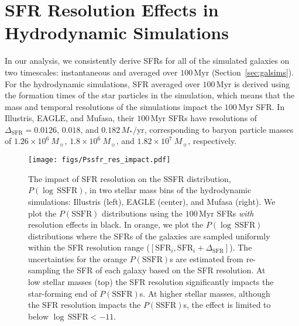 \documentclass[tighten, preprint]{aastex62}
\begin{document}
\section{SFR Resolution Effects in Hydrodynamic Simulations} \label{app:zerosfr}
In our analysis, we consistently derive SFRs for all of the simulated
galaxies on two timescales: instantaneous and averaged over 
$100\,\mathrm{Myr}$ (Section~\ref{sec:galsims}). For the hydrodynamic 
simulations, SFR averaged over $100\,\mathrm{Myr}$ is derived using 
the formation times of the star particles in the simulation, which 
means that the mass and temporal resolutions of the simulations 
impact the $100\,\mathrm{Myr}$ SFR. In Illustris, EAGLE, and {\sc Mufasa},
their $100\,\mathrm{Myr}$ SFRs have resolutions of 
$\Delta_\mathrm{SFR} = 0.0126$, $0.018$, and $0.182\,M_*/\mathrm{yr}$, 
corresponding to baryon particle masses of $1.26 \times 10^6\ M_{\sun}$, 
$1.8 \times 10^6\ M_{\sun}$, and $1.82 \times 10^7\ M_{\sun}$, respectively. 

\begin{figure*}
\begin{center}
\texttt{[image: figs/Pssfr\_res\_impact.pdf]} 
\caption{The impact of SFR resolution on the SSFR distribution, 
$P(\log\,\mathrm{SSFR})$, in two stellar mass bins of the hydrodynamic 
simulations:
Illustris (left), EAGLE (center), and {\sc Mufasa} (right). We plot the 
$P(\mathrm{SSFR})$ distributions using the $100\,\mathrm{Myr}$
SFRs \emph{with} resolution effects in black. In orange, we plot the 
$P(\log\,\mathrm{SSFR})$ distributions where the SFRs of the galaxies
are sampled uniformly within the SFR resolution range 
($[\mathrm{SFR}_i, \mathrm{SFR}_i+\Delta_\mathrm{SFR}]$). The 
uncertainties for the orange $P(\mathrm{SSFR})$s are estimated from 
re-sampling the SFR of each galaxy based on the SFR resolution. 
At low stellar masses (top) the SFR resolution significantly impacts 
the star-forming end of $P(\mathrm{SSFR})$s. At higher stellar masses, 
although the SFR resolution impacts the $P(\mathrm{SSFR})$s, the effect 
is limited to below $\log\,\mathrm{SSFR} < -11$.
} 
\label{fig:sfrres_pssfr}
\end{center}
\end{figure*}
\end{document}
